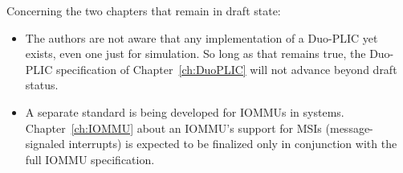 Concerning the two chapters that remain in draft state:
\begin{itemize}

\item
The authors are not aware that any implementation of
a Duo-PLIC yet exists, even one just for simulation.
So long as that remains true, the Duo-PLIC specification of
Chapter~\ref{ch:DuoPLIC} will not advance beyond draft status.

\item
A separate standard is being developed for IOMMUs in {\RISCV} systems.
Chapter~\ref{ch:IOMMU} about an IOMMU's support for MSIs
(message-signaled interrupts) is expected to be finalized
only in conjunction with the full {\RISCV} IOMMU specification.  
\end{itemize}

